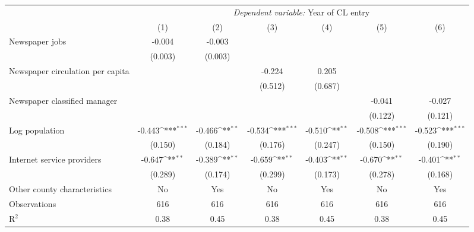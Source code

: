{
\def\sym#1{\ifmmode^{#1}\else\(^{#1}\)\fi}
\begin{tabular}{l*{6}{c}}
\toprule
                    &\multicolumn{6}{c}{\textit{Dependent variable:} Year of CL entry}                                                                  \\\cmidrule(lr){2-7}
                    &\multicolumn{1}{c}{(1)}         &\multicolumn{1}{c}{(2)}         &\multicolumn{1}{c}{(3)}         &\multicolumn{1}{c}{(4)}         &\multicolumn{1}{c}{(5)}         &\multicolumn{1}{c}{(6)}         \\
\midrule
Newspaper jobs      &      -0.004         &      -0.003         &                     &                     &                     &                     \\
                    &     (0.003)         &     (0.003)         &                     &                     &                     &                     \\
\addlinespace
Newspaper circulation per capita&                     &                     &      -0.224         &       0.205         &                     &                     \\
                    &                     &                     &     (0.512)         &     (0.687)         &                     &                     \\
\addlinespace
Newspaper classified manager&                     &                     &                     &                     &      -0.041         &      -0.027         \\
                    &                     &                     &                     &                     &     (0.122)         &     (0.121)         \\
\addlinespace
Log population      &      -0.443\sym{***}&      -0.466\sym{**} &      -0.534\sym{***}&      -0.510\sym{**} &      -0.508\sym{***}&      -0.523\sym{***}\\
                    &     (0.150)         &     (0.184)         &     (0.176)         &     (0.247)         &     (0.150)         &     (0.190)         \\
\addlinespace
Internet service providers&      -0.647\sym{**} &      -0.389\sym{**} &      -0.659\sym{**} &      -0.403\sym{**} &      -0.670\sym{**} &      -0.401\sym{**} \\
                    &     (0.289)         &     (0.174)         &     (0.299)         &     (0.173)         &     (0.278)         &     (0.168)         \\
\addlinespace
Other county characteristics &          No         &         Yes         &          No         &         Yes         &          No         &         Yes         \\
\midrule
Observations        &         616         &         616         &         616         &         616         &         616         &         616         \\
R$^2$               &        0.38         &        0.45         &        0.38         &        0.45         &        0.38         &        0.45         \\
\bottomrule
\end{tabular}
}
